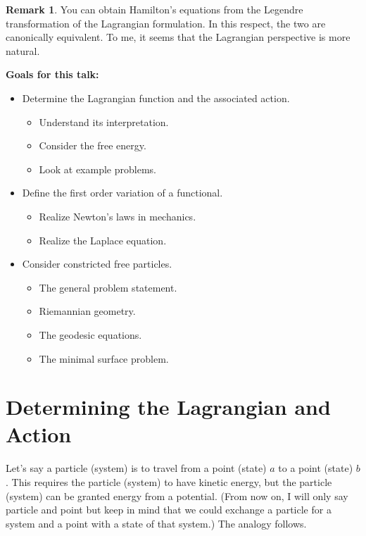 \documentclass[12pt]{article}
\theoremstyle{definition}
\newtheorem{remark}{Remark}[section]
\newcounter{ex}[section]\setcounter{ex}{0}
\begin{document}
\begin{remark}
You can obtain Hamilton's equations from the Legendre transformation of the Lagrangian formulation.  In this respect, the two are canonically equivalent.  To me, it seems that the Lagrangian perspective is more natural.
\end{remark}

\noindent \textbf{Goals for this talk:}
\begin{itemize}
    \item Determine the Lagrangian function and the associated action.
    \begin{itemize}
        \item Understand its interpretation.
        \item Consider the free energy.
        \item Look at example problems.
    \end{itemize}
    \item Define the first order variation of a functional.
    \begin{itemize}
        \item Realize Newton's laws in mechanics.
        \item Realize the Laplace equation.
    \end{itemize}
    \item Consider constricted free particles.
    \begin{itemize}
        \item The general problem statement.
        \item Riemannian geometry.
        \item The geodesic equations.
        \item The minimal surface problem.
    \end{itemize}
\end{itemize}

\section{Determining the Lagrangian and Action}

Let's say a particle (system) is to travel from a point (state) $a$ to a point (state) $b$.  This requires the particle (system) to have kinetic energy, but the particle (system) can be granted energy from a potential. (From now on, I will only say particle and point but keep in mind that we could exchange a particle for a system and a point with a state of that system.)  The analogy follows.
\end{document}
